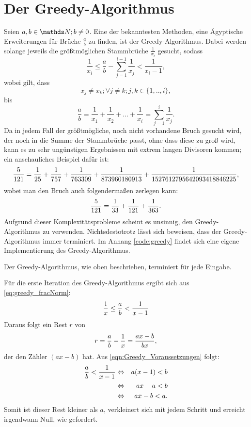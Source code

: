 \section{Der Greedy-Algorithmus}
Seien $a, b \in \N; b \neq 0$. Eine der bekanntesten Methoden, eine Ägyptische Erweiterungen für Brüche $\frac{a}{b}$ zu finden, ist der Greedy-Algorithmus. Dabei werden solange jeweils die größtmöglichen Stammbrüche $\frac{1}{x_i}$ gesucht, sodass
\begin{equation}\label{eq:greedy_fracNorm}
\frac{1}{x_i} \leq \frac{a}{b} - \sum_{j=1}^{i-1} \frac{1}{x_j} < \frac{1}{x_{i}-1},
\end{equation}
wobei gilt, dass
$$x_j \neq x_k; \forall j \neq k; j,k \in \{1,..,i\},$$ 
bis
$$\frac{a}{b} = \frac{1}{x_1} + \frac{1}{x_2} + ... + \frac{1}{x_i} = \sum_{j=1}^{i} \frac{1}{x_j}.$$
Da in jedem Fall der größtmögliche, noch nicht vorhandene Bruch gesucht wird, der noch in die Summe der Stammbrüche passt, ohne dass diese zu groß wird, kann es zu sehr ungünstigen Ergebnissen mit extrem langen Divisoren kommen; ein anschauliches Beispiel dafür ist:
$$\frac{5}{121} = \frac{1}{25} + \frac{1}{757} + \frac{1}{763309} + \frac{1}{873960180913} + \frac{1}{1527612795642093418846225},$$
wobei man den Bruch auch folgendermaßen zerlegen kann:
$$\frac{5}{121} = \frac{1}{33} + \frac{1}{121} + \frac{1}{363}.$$
Aufgrund dieser Komplexitätsprobleme scheint es unsinnig, den Greedy-Algorithmus zu verwenden. Nichtsdestotrotz lässt sich beweisen, dass der Greedy-Algorithmus immer terminiert.
Im Anhang \ref{code:greedy} findet sich eine eigene Implementierung des Greedy-Algorithmus.

\begin{satz}
	Der Greedy-Algorithmus, wie oben beschrieben, terminiert für jede Eingabe.
\end{satz}
\begin{bew}
	Für die erste Iteration des Greedy-Algorithmus ergibt sich aus \ref{eq:greedy_fracNorm}:
	\begin{equation}\label{eqn:Greedy_Voraussetzungen}
		\frac{1}{x} \leq \frac{a}{b} < \frac{1}{x-1}
	\end{equation}
	Daraus folgt ein Rest $r$ von
	$$ r = \frac{a}{b}-\frac{1}{x} = \frac{ax-b}{bx},$$
	der den Zähler $(ax-b)$ hat. Aus \ref{eqn:Greedy_Voraussetzungen} folgt:
	\begin{eqnarray*}
		\frac{a}{b} < \frac{1}{x-1}& \Leftrightarrow & a(x-1)<b\\
		& \Leftrightarrow & ax-a < b\\
		& \Leftrightarrow & ax-b < a.\\
	\end{eqnarray*}
	Somit ist dieser Rest kleiner als $a$, verkleinert sich mit jedem Schritt und erreicht irgendwann Null, wie gefordert.
\end{bew}